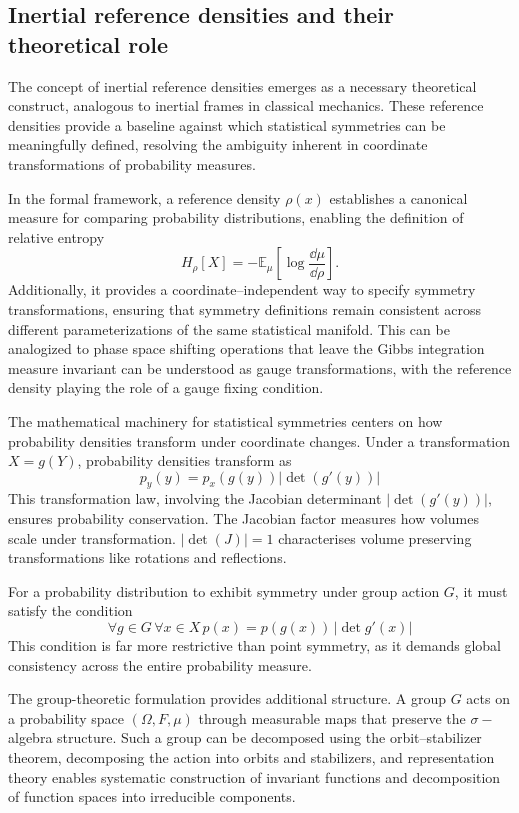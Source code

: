    \subsection{Inertial reference densities and their theoretical role}
        The concept of inertial reference densities emerges as a necessary theoretical construct, analogous to inertial frames in classical mechanics.\kd{}
        These reference densities provide a baseline against which statistical symmetries can be meaningfully defined, resolving the ambiguity inherent in coordinate transformations of probability measures.

        In the formal framework, a reference density \(\rho(x)\) establishes a canonical measure for comparing probability distributions, enabling the definition of relative entropy
        \[
            H_\rho[X] = -\mathbb{E}_\mu[\log\frac{\dd\mu}{\dd\rho}].
        \]
        Additionally, it provides a coordinate--independent way to specify symmetry transformations, ensuring that symmetry definitions remain consistent across different parameterizations of the same statistical manifold.
        This can be analogized to phase space shifting operations that leave the Gibbs integration measure invariant can be understood as gauge transformations, with the reference density playing the role of a gauge fixing condition.
        
        The mathematical machinery for statistical symmetries centers on how probability densities transform under coordinate changes.
        Under a transformation \(X = g(Y)\), probability densities transform as
            \[
                p_y(y) = p_x(g(y)) |\det(g'(y))|
            \]
        This transformation law, involving the Jacobian determinant \(|\det(g'(y))|,\) ensures probability conservation.
        The Jacobian factor measures how volumes scale under transformation.
        \(|\det(J)| = 1\) characterises volume preserving transformations like rotations and reflections.

        For a probability distribution to exhibit symmetry under group action \(G\), it must satisfy the condition
        \[
            \forall g\in G\,\forall x\in X\,p(x) = p(g(x))\,|\det g'(x)|
        \]
        This condition is far more restrictive than point symmetry, as it demands global consistency across the entire probability measure.

        The group-theoretic formulation provides additional structure.
        A group \(G\) acts on a probability space \((\Omega, F, \mu)\) through measurable maps that preserve the \(\sigma-\)algebra structure.
        Such a group can be decomposed using the orbit--stabilizer theorem, decomposing the action into orbits and stabilizers, and representation theory enables systematic construction of invariant functions and decomposition of function spaces into irreducible components.
        
